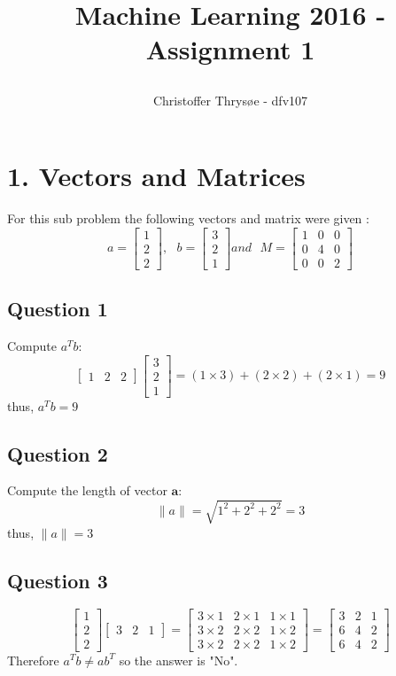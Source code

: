 \documentclass{article}
\title{
\vspace{1in}
\textmd{\textbf{Machine Learning 2016 - Assignment 1}} \\
\author{Christoffer Thrysøe - dfv107}
}
\begin{document}
\maketitle
{}
\section{1. Vectors and Matrices}
For this sub problem the following vectors and matrix were given :
$$
a = \begin{bmatrix}
1\\
2\\
2\end{bmatrix}, \textbf{ }
b = \begin{bmatrix}
3\\
2\\
1\end{bmatrix} and \textbf{ }
M = \begin{bmatrix}
1&0&0\\
0&4&0\\
0&0&2\end{bmatrix}
$$

\subsection{Question 1}
Compute $ a^Tb $:
$$
\begin{bmatrix}
1 & 2 & 2\end{bmatrix}
\begin{bmatrix}
3\\
2\\
1\end{bmatrix}
= (1 \times 3) + ( 2 \times 2) + (2 \times 1) = 9
$$
thus, $a^Tb=9$
\subsection{Question 2}
Compute the length of vector $\textbf{a}$:
$$ \|a\| = \sqrt{ 1^2 + 2^2 + 2^2} = 3 $$ 
thus, $\|a\| = 3$
\subsection{Question 3}
$$
\begin{bmatrix}
1\\
2\\
2\end{bmatrix}
\begin{bmatrix}
3 & 2 & 1\end{bmatrix}
=
\begin{bmatrix}
3 \times 1 & 2 \times 1 &1 \times 1 \\
3 \times 2 & 2 \times 2 & 1 \times 2 \\
3 \times 2 & 2 \times 2 & 1 \times 2 \end{bmatrix}
=
\begin{bmatrix}
3 & 2 & 1 \\
6 & 4 & 2 \\
6 & 4 & 2
\end{bmatrix}
$$
Therefore 
$a^Tb \neq ab^T$ so the answer is "No".
\end{document}
